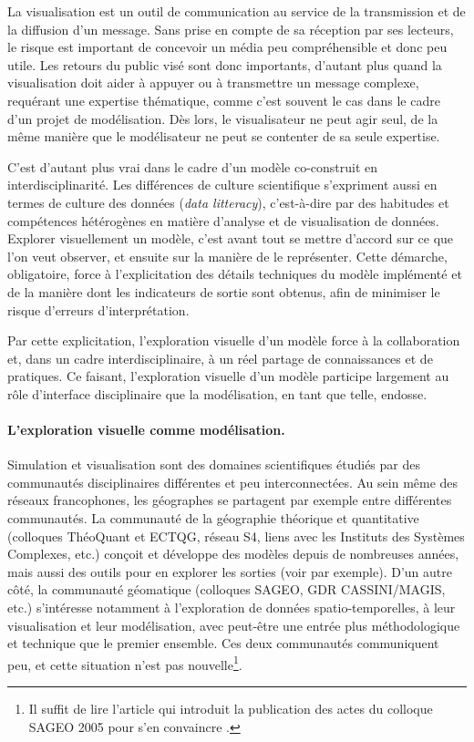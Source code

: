 La visualisation est un outil de communication au service de la transmission et de la diffusion d'un message.
Sans prise en compte de sa réception par ses lecteurs, le risque est important de concevoir un média peu compréhensible et donc peu utile.
Les retours du public visé sont donc importants, d'autant plus quand la visualisation doit aider à appuyer ou à transmettre un message complexe, requérant une expertise thématique, comme c'est souvent le cas dans le cadre d'un projet de modélisation.
Dès lors, le visualisateur ne peut agir seul, de la même manière que le modélisateur ne peut se contenter de sa seule expertise.

C'est d'autant plus vrai dans le cadre d'un modèle co-construit en interdisciplinarité.
Les différences de culture scientifique s'expriment aussi en termes de \og culture des données\fg{} (\textit{data litteracy}), c'est-à-dire par des habitudes et compétences hétérogènes en matière d'analyse et de visualisation de données.
Explorer visuellement un modèle, c'est avant tout se mettre d'accord sur ce que l'on veut observer, et ensuite sur la manière de le représenter.
Cette démarche, obligatoire, force à l'explicitation des détails techniques du modèle implémenté et de la manière dont les indicateurs de sortie sont obtenus, afin de minimiser le risque d'erreurs d'interprétation.

Par cette explicitation, l'exploration visuelle d'un modèle force à la collaboration et, dans un cadre interdisciplinaire, à un réel partage de connaissances et de pratiques.
Ce faisant, l'exploration visuelle d'un modèle participe largement au rôle d'interface disciplinaire que la modélisation, en tant que telle, endosse.

\paragraph{L'exploration visuelle comme modélisation.}
Simulation et visualisation sont des domaines scientifiques étudiés par des communautés disciplinaires différentes et peu interconnectées.
Au sein même des réseaux francophones, les géographes se partagent par exemple entre différentes communautés.
La communauté de la géographie théorique et quantitative (colloques ThéoQuant et ECTQG, réseau S4, liens avec les Instituts des Systèmes Complexes, etc.) conçoit et développe des modèles depuis de nombreuses années, mais aussi des outils pour en explorer les sorties (voir \textcite{tannier:halshs-01003259} par exemple).
D'un autre côté, la communauté géomatique (colloques SAGEO, GDR CASSINI/MAGIS, etc.) s'intéresse notamment à l'exploration de données spatio-temporelles, à leur visualisation et leur modélisation, avec peut-être une entrée plus méthodologique et technique que le premier ensemble.
Ces deux communautés communiquent peu, et cette situation n'est pas nouvelle\footnote{
	Il suffit de lire l'article qui introduit la publication des actes du colloque SAGEO 2005 pour s'en convaincre \autocite{josselin_presentation_2006}.
}.

